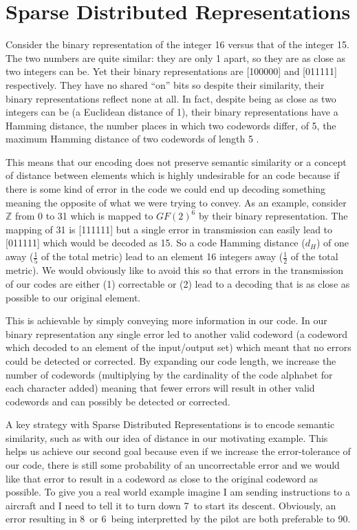 \documentclass[oneside,12pt,openany]{book}
\begin{document}
	\section{Sparse Distributed Representations}
	
	Consider the binary representation of the integer 16 versus that of the integer 15. The two numbers are quite similar: they are only 1 apart, so they are as close as two integers can be. Yet their binary representations are [100000] and [011111] respectively. They have no shared ``on'' bits so despite their similarity, their binary representations reflect none at all. In fact, despite being as close as two integers can be (a Euclidean distance of 1), their binary representations have a Hamming distance, the number places in which two codewords differ, of 5, the maximum Hamming distance of two codewords of length 5 \cite{Adams}. 
	
	This means that our encoding does not preserve semantic similarity or a concept of distance between elements which is highly undesirable for an code because if there is some kind of error in the code we could end up decoding something meaning the opposite of what we were trying to convey. As an example, consider $\mathbb{Z}$ from 0 to 31 which is mapped to $GF(2)^{6}$ by their binary representation. The mapping of 31 is [111111] but a single error in transmission can easily lead to [011111] which would be decoded as 15. So a code Hamming distance ($d_{H}$) of one away ($\frac{1}{5}$ of the total metric) lead to an element 16 integers away ($\frac{1}{2}$ of the total metric). We would obviously like to avoid this so that errors in the transmission of our codes are either (1) correctable or (2) lead to a decoding that is as close as possible to our original element.
	
	This is achievable by simply conveying more information in our code. In our binary representation any single error led to another valid codeword (a codeword which decoded to an element of the input/output set) which meant that no errors could be detected or corrected. By expanding our code length, we increase the number of codewords (multiplying by the cardinality of the code alphabet for each character added) meaning that fewer errors will result in other valid codewords and can possibly be detected or corrected. 
	
	A key strategy with Sparse Distributed Representations is to encode semantic similarity, such as with our idea of distance in our motivating example. This helps us achieve our second goal because even if we increase the error-tolerance of our code, there is still some probability of an uncorrectable error and we would like that error to result in a codeword as close to the original codeword as possible. To give you a real world example imagine I am sending instructions to a aircraft and I need to tell it to turn down 7\textdegree~to start its descent. Obviously, an error resulting in 8\textdegree~or 6\textdegree~being interpretted by the pilot are both preferable to 90\textdegree.
	
\end{document}
